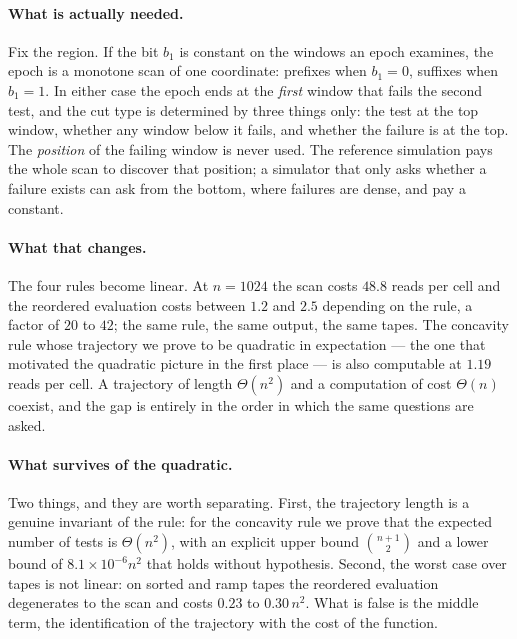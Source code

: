 \documentclass[11pt]{article}
\begin{document}
\paragraph{What is actually needed.} Fix the region. If the bit $b_1$ is constant on the
windows an epoch examines, the epoch is a monotone scan of one coordinate: prefixes when
$b_1=0$, suffixes when $b_1=1$. In either case the epoch ends at the \emph{first} window
that fails the second test, and the cut type is determined by three things only: the test
at the top window, whether any window below it fails, and whether the failure is at the
top. The \emph{position} of the failing window is never used. The reference simulation
pays the whole scan to discover that position; a simulator that only asks whether a
failure exists can ask from the bottom, where failures are dense, and pay a constant.

\paragraph{What that changes.} The four rules become linear. At $n=1024$ the scan costs
$48.8$ reads per cell and the reordered evaluation costs between $1.2$ and $2.5$ depending on
the rule, a factor of $20$ to $42$; the same rule, the same output, the same tapes. The concavity rule whose trajectory we prove
to be quadratic in expectation --- the one that motivated the quadratic picture in the
first place --- is also computable at $1.19$ reads per cell. A trajectory of length
$\Theta(n^2)$ and a computation of cost $\Theta(n)$ coexist, and the gap is entirely in
the order in which the same questions are asked.

\paragraph{What survives of the quadratic.} Two things, and they are worth separating.
First, the trajectory length is a genuine invariant of the rule: for the concavity rule we
prove that the expected number of tests is $\Theta(n^2)$, with an explicit upper bound
$\binom{n+1}{2}$ and a lower bound of $8.1\times 10^{-6}n^2$ that holds without hypothesis.
Second, the worst case over tapes is not linear: on sorted and ramp tapes the reordered
evaluation degenerates to the scan and costs $0.23$ to $0.30\,n^2$. What is false is the
middle term, the identification of the trajectory with the cost of the function.
\end{document}
